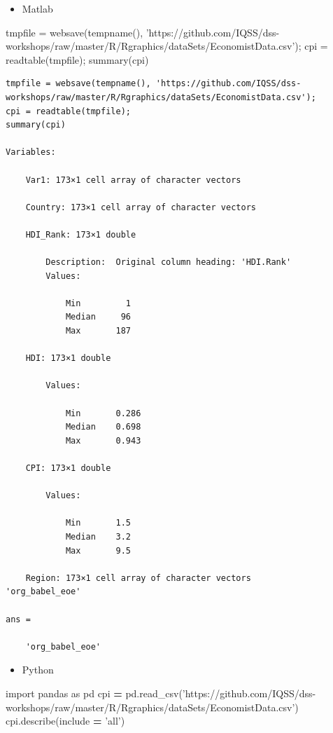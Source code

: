 \documentclass[
]{book}
\newenvironment{Shaded}{\begin{snugshade}}{\end{snugshade}}
\newcommand{\ImportTok}[1]{#1}
\newcommand{\NormalTok}[1]{#1}
\newcommand{\OperatorTok}[1]{\textcolor[rgb]{0.81,0.36,0.00}{\textbf{#1}}}
\newcommand{\StringTok}[1]{\textcolor[rgb]{0.31,0.60,0.02}{#1}}
\providecommand{\tightlist}{%
  \setlength{\itemsep}{0pt}\setlength{\parskip}{0pt}}
\begin{document}
\begin{itemize}
\tightlist
\item
  Matlab
\end{itemize}

\begin{Shaded}
\begin{Highlighting}[]
\NormalTok{tmpfile = websave(tempname(), }\StringTok{'https://github.com/IQSS/dss-workshops/raw/master/R/Rgraphics/dataSets/EconomistData.csv'}\NormalTok{);}
\NormalTok{cpi = readtable(tmpfile);}
\NormalTok{summary(cpi)}
\end{Highlighting}
\end{Shaded}

\begin{verbatim}
tmpfile = websave(tempname(), 'https://github.com/IQSS/dss-workshops/raw/master/R/Rgraphics/dataSets/EconomistData.csv');
cpi = readtable(tmpfile);
summary(cpi)

Variables:

    Var1: 173×1 cell array of character vectors

    Country: 173×1 cell array of character vectors

    HDI_Rank: 173×1 double

        Description:  Original column heading: 'HDI.Rank'
        Values:

            Min         1       
            Median     96       
            Max       187       

    HDI: 173×1 double

        Values:

            Min       0.286
            Median    0.698
            Max       0.943

    CPI: 173×1 double

        Values:

            Min       1.5  
            Median    3.2  
            Max       9.5  

    Region: 173×1 cell array of character vectors
'org_babel_eoe'

ans =

    'org_babel_eoe'
\end{verbatim}

\begin{itemize}
\tightlist
\item
  Python
\end{itemize}

\begin{Shaded}
\begin{Highlighting}[]
\ImportTok{import}\NormalTok{ pandas }\ImportTok{as}\NormalTok{ pd}
\NormalTok{cpi }\OperatorTok{=}\NormalTok{ pd.read_csv(}\StringTok{'https://github.com/IQSS/dss-workshops/raw/master/R/Rgraphics/dataSets/EconomistData.csv'}\NormalTok{)}
\NormalTok{cpi.describe(include }\OperatorTok{=} \StringTok{'all'}\NormalTok{)}
\end{Highlighting}
\end{Shaded}
\end{document}
